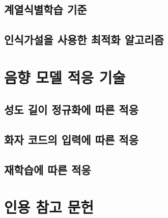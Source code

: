 \documentclass[../main.tex]{subfiles}
\begin{document}
\subsection{계열식별학습 기준}
\subsection{인식가설을 사용한 최적화 알고리즘}

\section{음향 모델 적응 기술}
\subsection{성도 길이 정규화에 따른 적응}
\subsection{화자 코드의 입력에 따른 적응}
\subsection{재학습에 따른 적응}

\section*{인용 참고 문헌}
\end{document}
